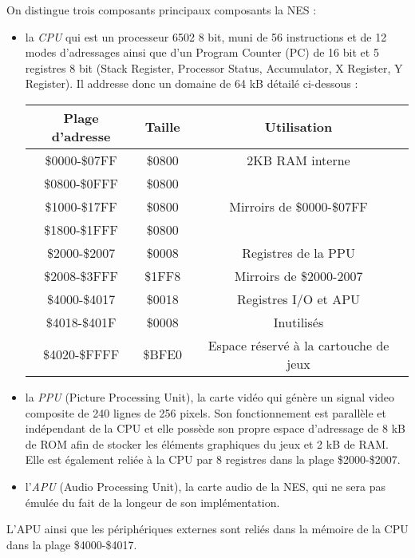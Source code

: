 On distingue trois composants principaux composants la NES :
\begin{itemize}
\item la \emph{CPU} qui est un processeur 6502 8 bit, muni de 56 instructions et de 12 modes d'adressages ainsi que d'un Program Counter (PC) de 16 bit et 5 registres 8 bit (Stack Register, Processor Status, Accumulator, X Register, Y Register). Il addresse donc un domaine de 64 kB détailé ci-dessous :

\begin{center}
\begin{tabular}{|c|c|c|}
  \hline
  Plage d'adresse & Taille & Utilisation \\
  \hline
  \$0000-\$07FF & \$0800 & 2KB RAM interne\\
  \hline
  \$0800-\$0FFF & \$0800 & \\
  \$1000-\$17FF & \$0800 & Mirroirs de \$0000-\$07FF\\
  \$1800-\$1FFF & \$0800 & \\
  \hline
  \$2000-\$2007 & \$0008 & Registres de la PPU \\
  \hline
  \$2008-\$3FFF & \$1FF8 & Mirroirs de \$2000-2007 \\
  \hline
  \$4000-\$4017 & \$0018 & Registres I/O et APU \\
  \hline
  \$4018-\$401F & \$0008 & Inutilisés \\
  \hline
  \$4020-\$FFFF & \$BFE0 & Espace réservé à la cartouche de jeux \\
  \hline
\end{tabular}
\end{center}
\hspace{1pt}

\item la \emph{PPU} (Picture Processing Unit), la carte vidéo qui génère un signal video composite de 240 lignes de 256 pixels. Son fonctionnement est parallèle et indépendant de la CPU et elle possède son propre espace d'adressage de 8 kB de ROM afin de stocker les éléments graphiques du jeux et 2 kB de RAM. Elle est également reliée à la CPU par 8 registres dans la plage \$2000-\$2007.
\item l'\emph{APU} (Audio Processing Unit), la carte audio de la NES, qui ne sera pas émulée du fait de la longeur de son implémentation.
\end{itemize}

L'APU ainsi que les périphériques externes sont reliés dans la mémoire de la CPU dans la plage \$4000-\$4017.

